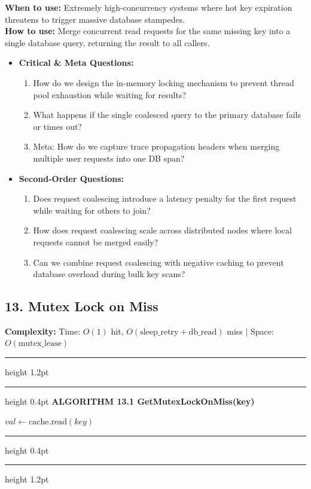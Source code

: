 \documentclass[11pt,a4paper]{article}
\newenvironment{textbookalgo}[2]{%
  \par\addvspace{1.2em}\noindent
  \hrule height 1.2pt
  \vspace{1.5pt}
  \hrule height 0.4pt
  \vspace{5pt}
  {\noindent\large\bfseries\sffamily ALGORITHM #1 \quad #2}
  \par\vspace{5pt}
  \RestyleAlgo{plain}
}{%
  \par\vspace{4pt}
  \hrule height 0.4pt
  \vspace{1.5pt}
  \hrule height 1.2pt
  \par\addvspace{1.2em}
}
\theoremstyle{definition}
\begin{document}
\noindent
\textbf{When to use:} Extremely high-concurrency systems where hot key expiration threatens to trigger massive database stampedes.\\
\textbf{How to use:} Merge concurrent read requests for the same missing key into a single database query, returning the result to all callers.
\begin{itemize}[leftmargin=*]
  \item[] \textbf{Critical \& Meta Questions:}
  \begin{enumerate}
  \item How do we design the in-memory locking mechanism to prevent thread pool exhaustion while waiting for results?
  \item What happens if the single coalesced query to the primary database fails or times out?
  \item Meta: How do we capture trace propagation headers when merging multiple user requests into one DB span?
  \end{enumerate}
  \item[] \textbf{Second-Order Questions:}
  \begin{enumerate}
  \item Does request coalescing introduce a latency penalty for the first request while waiting for others to join?
  \item How does request coalescing scale across distributed nodes where local requests cannot be merged easily?
  \item Can we combine request coalescing with negative caching to prevent database overload during bulk key scans?
  \end{enumerate}
\end{itemize}
\medskip

\clearpage
\subsection{13. Mutex Lock on Miss}

\noindent
\textbf{Complexity:} Time: $O(1)$ hit, $O(\text{sleep\_retry} + \text{db\_read})$ miss | Space: $O(\text{mutex\_lease})$
\smallskip

\begin{textbookalgo}{13.1}{GetMutexLockOnMiss(key)}
\begin{algorithm}[H]
$val \leftarrow \text{cache.read}(key)$\;
\end{algorithm}
\end{textbookalgo}
\end{document}
